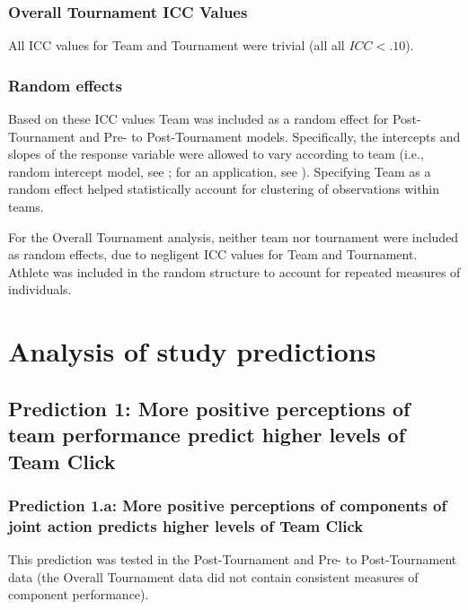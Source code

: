 \begin{CJK}{UTF8}{gbsn}
\subsubsection{Overall Tournament ICC Values}
All ICC values for Team and Tournament were trivial (all all $ICC < .10$).

\subsubsection{Random effects}
Based on these ICC values Team was included as a random effect for Post-Tournament and Pre- to Post-Tournament models. Specifically, the intercepts and slopes of the response variable were allowed to vary according to team (i.e., random intercept model, see \textcite{Pinheiro2000}; for an application, see \textcite{Oberauer2006}). Specifying Team as a random effect helped statistically account for clustering of observations within teams.

For the Overall Tournament analysis, neither team nor tournament were included as random effects, due to negligent ICC values for Team and Tournament.  Athlete was included in the random structure to account for repeated measures of individuals.















\clearpage




\section{Analysis of study predictions}


\subsection{Prediction 1: More positive perceptions of team performance predict higher levels of Team Click}


\subsubsection{Prediction 1.a: More positive perceptions of components of joint action predicts higher levels of Team Click\label{sect:prediction1a}}

This prediction was tested in the Post-Tournament and Pre- to Post-Tournament data (the Overall Tournament data did not contain consistent measures of component performance).



\end{CJK}
